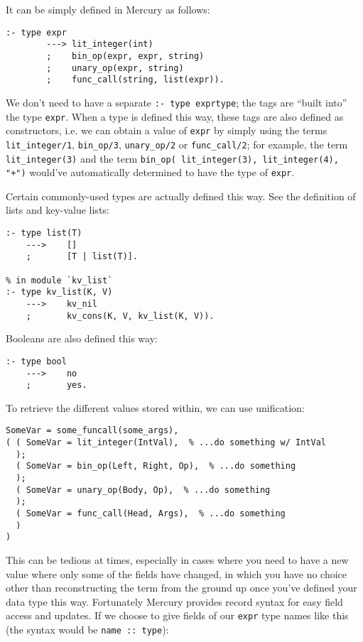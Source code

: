   It can be simply defined in Mercury as follows:

\begin{lstlisting}[language=Mercury]
:- type expr
        ---> lit_integer(int)
        ;    bin_op(expr, expr, string)
        ;    unary_op(expr, string)
        ;    func_call(string, list(expr)).
\end{lstlisting}

  We don't need to have a separate \texttt{:- type exprtype}; the tags are ``built into'' the type \texttt{expr}. When a type is defined this way, these tags are also defined as constructors, i.e. we can obtain a value of \texttt{expr} by simply using the terms \texttt{lit\_integer/1}, \texttt{bin\_op/3}, \texttt{unary\_op/2} or \texttt{func\_call/2}; for example, the term \texttt{lit\_integer(3)} and the term \texttt{bin\_op( lit\_integer(3), lit\_integer(4), "+")} would've automatically determined to have the type of \texttt{expr}.

Certain commonly-used types are actually defined this way. See the definition of lists and key-value lists:

\begin{lstlisting}[language=Mercury]
% in module `list`
:- type list(T)
    --->    []
    ;       [T | list(T)].

% in module `kv_list`
:- type kv_list(K, V)
    --->    kv_nil
    ;       kv_cons(K, V, kv_list(K, V)).
\end{lstlisting}

  Booleans are also defined this way:

\begin{lstlisting}[language=Mercury]
% in module `bool`
:- type bool
    --->    no
    ;       yes.
\end{lstlisting}
  
  To retrieve the different values stored within, we can use unification:

\begin{lstlisting}[language=Mercury]
% ...
SomeVar = some_funcall(some_args),
( ( SomeVar = lit_integer(IntVal),  % ...do something w/ IntVal
  );
  ( SomeVar = bin_op(Left, Right, Op),  % ...do something
  );
  ( SomeVar = unary_op(Body, Op),  % ...do something
  );
  ( SomeVar = func_call(Head, Args),  % ...do something
  )
)
\end{lstlisting}

  This can be tedious at times, especially in cases where you need to have a new value where only some of the fields have changed, in which you have no choice other than reconstructing the term from the ground up once you've defined your data type this way. Fortunately Mercury provides record syntax for easy field access and updates. If we choose to give fields of our \texttt{expr} type names like this (the syntax would be \texttt{name :: type}):

